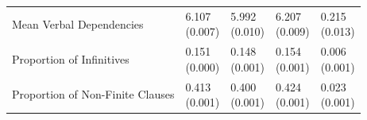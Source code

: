 \begin{tabular}{lllll}
Mean Verbal Dependencies & \shortstack{6.107 \\ (0.007)} & \shortstack{5.992 \\ (0.010)} & \shortstack{6.207 \\ (0.009)} & \shortstack{0.215 \\ (0.013)} \\
Proportion of Infinitives & \shortstack{0.151 \\ (0.000)} & \shortstack{0.148 \\ (0.001)} & \shortstack{0.154 \\ (0.001)} & \shortstack{0.006 \\ (0.001)} \\
Proportion of Non-Finite Clauses & \shortstack{0.413 \\ (0.001)} & \shortstack{0.400 \\ (0.001)} & \shortstack{0.424 \\ (0.001)} & \shortstack{0.023 \\ (0.001)} \\
\bottomrule
\end{tabular}
